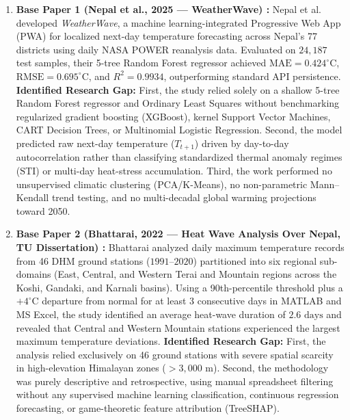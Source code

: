 \documentclass[conference]{IEEEtran}
\begin{document}
\begin{enumerate}
    \item \textbf{Base Paper 1 (Nepal et al., 2025 --- WeatherWave) \cite{nepal2025}:} Nepal et al. developed \textit{WeatherWave}, a machine learning-integrated Progressive Web App (PWA) for localized next-day temperature forecasting across Nepal's 77 districts using daily NASA POWER reanalysis data. Evaluated on $24,187$ test samples, their 5-tree Random Forest regressor achieved $\text{MAE} = 0.424^\circ\text{C}$, $\text{RMSE} = 0.695^\circ\text{C}$, and $R^2 = 0.9934$, outperforming standard API persistence. \textbf{Identified Research Gap:} First, the study relied solely on a shallow 5-tree Random Forest regressor and Ordinary Least Squares without benchmarking regularized gradient boosting (XGBoost), kernel Support Vector Machines, CART Decision Trees, or Multinomial Logistic Regression. Second, the model predicted raw next-day temperature ($T_{t+1}$) driven by day-to-day autocorrelation rather than classifying standardized thermal anomaly regimes ($\text{STI}$) or multi-day heat-stress accumulation. Third, the work performed no unsupervised climatic clustering (PCA/K-Means), no non-parametric Mann--Kendall trend testing, and no multi-decadal global warming projections toward 2050.
    
    \item \textbf{Base Paper 2 (Bhattarai, 2022 --- Heat Wave Analysis Over Nepal, TU Dissertation) \cite{bhattarai2022}:} Bhattarai analyzed daily maximum temperature records from 46 DHM ground stations ($1991\text{--}2020$) partitioned into six regional sub-domains (East, Central, and Western Terai and Mountain regions across the Koshi, Gandaki, and Karnali basins). Using a 90th-percentile threshold plus a $+4^\circ\text{C}$ departure from normal for at least 3 consecutive days in MATLAB and MS Excel, the study identified an average heat-wave duration of $2.6\text{ days}$ and revealed that Central and Western Mountain stations experienced the largest maximum temperature deviations. \textbf{Identified Research Gap:} First, the analysis relied exclusively on 46 ground stations with severe spatial scarcity in high-elevation Himalayan zones ($>3,000\text{ m}$). Second, the methodology was purely descriptive and retrospective, using manual spreadsheet filtering without any supervised machine learning classification, continuous regression forecasting, or game-theoretic feature attribution (TreeSHAP).
    

\end{enumerate}
\end{document}
